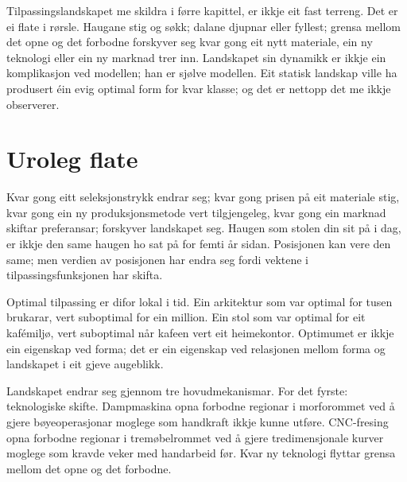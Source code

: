 

Tilpassingslandskapet me skildra i førre kapittel, er ikkje eit fast terreng. Det er ei flate i rørsle. Haugane stig og søkk; dalane djupnar eller fyllest; grensa mellom det opne og det forbodne forskyver seg kvar gong eit nytt materiale, ein ny teknologi eller ein ny marknad trer inn. Landskapet sin dynamikk er ikkje ein komplikasjon ved modellen; han er sjølve modellen. Eit statisk landskap ville ha produsert éin evig optimal form for kvar klasse; og det er nettopp det me ikkje observerer.

\section*{Uroleg flate}


Kvar gong eitt seleksjonstrykk endrar seg; kvar gong prisen på eit materiale stig, kvar gong ein ny produksjonsmetode vert tilgjengeleg, kvar gong ein marknad skiftar preferansar; forskyver landskapet seg. Haugen som stolen din sit på i dag, er ikkje den same haugen ho sat på for femti år sidan. Posisjonen kan vere den same; men verdien av posisjonen har endra seg fordi vektene i tilpassingsfunksjonen har skifta.

Optimal tilpassing er difor lokal i tid. Ein arkitektur som var optimal for tusen brukarar, vert suboptimal for ein million. Ein stol som var optimal for eit kafémiljø, vert suboptimal når kafeen vert eit heimekontor. Optimumet er ikkje ein eigenskap ved forma; det er ein eigenskap ved relasjonen mellom forma og landskapet i eit gjeve augeblikk.


Landskapet endrar seg gjennom tre hovudmekanismar. For det fyrste: teknologiske skifte. Dampmaskina opna forbodne regionar i morforommet ved å gjere bøyeoperasjonar moglege som handkraft ikkje kunne utføre. CNC-fresing opna forbodne regionar i tremøbelrommet ved å gjere tredimensjonale kurver moglege som kravde veker med handarbeid før. Kvar ny teknologi flyttar grensa mellom det opne og det forbodne.

